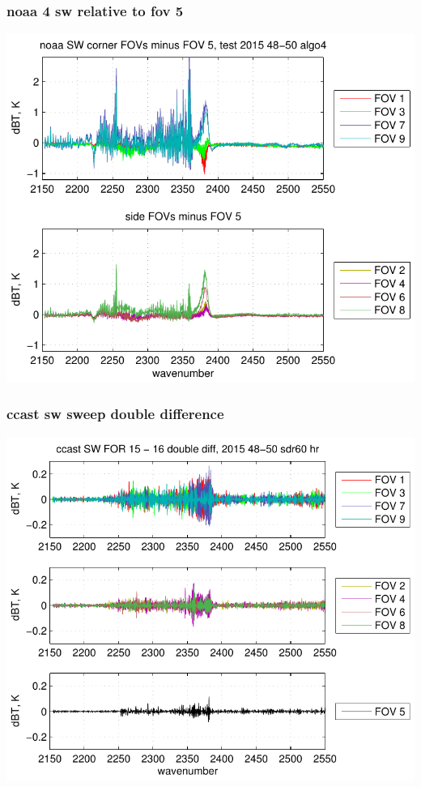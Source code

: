 \documentclass[11pt]{beamer}
\begin{document}
\begin{frame}
\frametitle{noaa 4 sw relative to fov 5}
\begin{center}
  \includegraphics[scale=0.7]{figures/noaa_SW_dif_2015_48-50_algo4.pdf}
\end{center}
\end{frame}
\begin{frame}
\frametitle{ccast sw sweep double difference}
\begin{center}
  \includegraphics[scale=0.7]{figures/ccast_SW_sfil_2015_48-50_sdr60_hr.pdf}
\end{center}
\end{frame}
\end{document}

